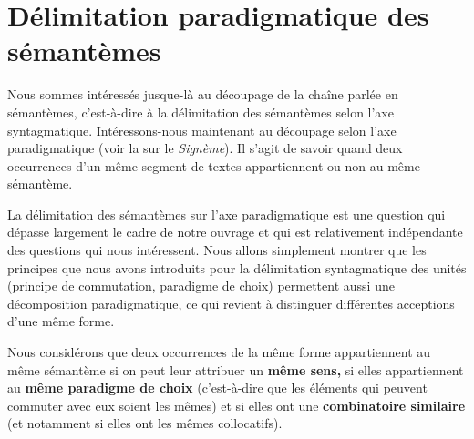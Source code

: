 \section{Délimitation paradigmatique des sémantèmes}\label{sec:2.3.13}

Nous sommes intéressés jusque-là au découpage de la chaîne parlée en sémantèmes, c’est-à-dire à la délimitation des sémantèmes selon l’axe syntagmatique. Intéressons-nous maintenant au découpage selon l’axe paradigmatique (voir la  sur le \textit{Signème}). Il s’agit de savoir quand deux occurrences d’un même segment de textes appartiennent ou non au même sémantème.

La délimitation des sémantèmes sur l’axe paradigmatique est une question qui dépasse largement le cadre de notre ouvrage et qui est relativement indépendante des questions qui nous intéressent. Nous allons simplement montrer que les principes que nous avons introduits pour la délimitation syntagmatique des unités (principe de commutation, paradigme de choix) permettent aussi une décomposition paradigmatique, ce qui revient à distinguer différentes acceptions d’une même forme.

Nous considérons que deux occurrences de la même forme appartiennent au même sémantème si on peut leur attribuer un \textbf{même sens,} si elles appartiennent au \textbf{même paradigme de choix} (c’est-à-dire que les éléments qui peuvent commuter avec eux soient les mêmes) et si elles ont une \textbf{combinatoire similaire} (et notamment si elles ont les mêmes collocatifs).

